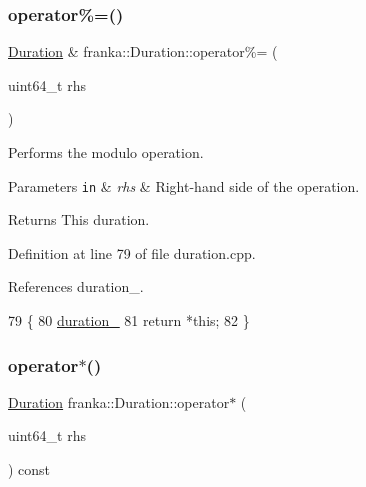 \subsubsection{\texorpdfstring{operator\%=()}{operator\%=()}\hspace{0.1cm}{\footnotesize\ttfamily [2/2]}}
{\footnotesize\ttfamily \hyperlink{classfranka_1_1Duration}{Duration} \& franka\+::\+Duration\+::operator\%= (\begin{DoxyParamCaption}\item[{uint64\+\_\+t}]{rhs }\end{DoxyParamCaption})\hspace{0.3cm}{\ttfamily [noexcept]}}

Performs the modulo operation.


\begin{DoxyParams}[1]{Parameters}
\mbox{\tt in}  & {\em rhs} & Right-\/hand side of the operation.\\
\hline
\end{DoxyParams}
\begin{DoxyReturn}{Returns}
This duration. 
\end{DoxyReturn}


Definition at line 79 of file duration.\+cpp.



References duration\+\_\+.


\begin{DoxyCode}
79                                                     \{
80   \hyperlink{classfranka_1_1Duration_ae446c403b200f0dbf92fb51ca21e82ff}{duration\_} %
81   \textcolor{keywordflow}{return} *\textcolor{keyword}{this};
82 \}
\end{DoxyCode}
\mbox{\label{classfranka_1_1Duration_a3eebc39550880fb2d23d45ba34d8acc5}} 
\subsubsection{\texorpdfstring{operator$\ast$()}{operator*()}}
{\footnotesize\ttfamily \hyperlink{classfranka_1_1Duration}{Duration} franka\+::\+Duration\+::operator$\ast$ (\begin{DoxyParamCaption}\item[{uint64\+\_\+t}]{rhs }\end{DoxyParamCaption}) const\hspace{0.3cm}{\ttfamily [noexcept]}}

